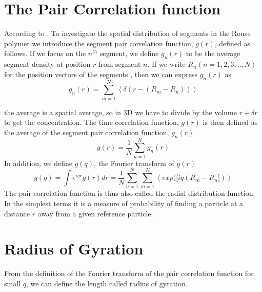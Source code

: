 \documentclass{paper}
\begin{document}
\section{The Pair Correlation function}\label{thePairCorrelationFunction}
According to \cite{doi1996introduction}. To investigate the spatial distribution of segments in the Rouse polymer we introduce the segment pair correlation function, $g(r)$, defined as follows. If we focus on the $n^{th}$ segment, we define $g_n(r)$ to be the average segment density at position $r$ from segment $n$. If we write $R_n(n=1,2,3,..,N)$ for the position vectors of the segments , then we can express $g_n(r)$ as 
\begin{equation*}
g_n(r)=\sum_{m=1}^N \left<\delta(r-(R_m-R_n)) \right>
\end{equation*} 

the average is a spatial average, so in 3D we have to divide by the volume $r+\delta r$ to get the concentration. The time correlation function, $g(r)$  is then defined as the average of the segment pair correlation function, $g_n(r)$. 
\begin{equation*}
g(r) = \frac{1}{N}\sum_{n=1}^{N}g_n(r)
\end{equation*}
In addition, we define $g(q)$, the Fourier transform of $g(r)$
\begin{equation*}
g(q) = \int e^{iqr}g(r)dr = \frac{1}{N}\sum\limits_{n=1}^{N}\sum\limits_{m=1}^{N}\left<exp([iq(R_m-R_n]) \right>
\end{equation*}
The pair correlation function is thus also called the radial distribution function. In the simplest terms it is a measure of probability of finding a particle at a distance $r$ away from a given reference particle. 


\section{Radius of Gyration}\label{radiusOfGyration}
From the definition of the Fourier transform of the pair correlation function for small $q$, we can define the length called radius of gyration. 
\end{document}
